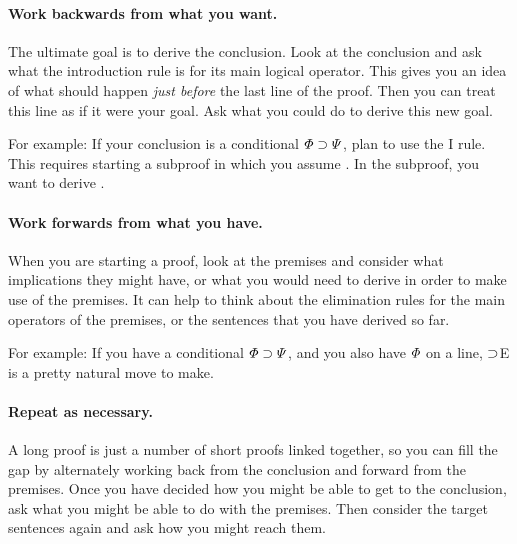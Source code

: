 \paragraph{Work backwards from what you want.}
The ultimate goal is to derive the conclusion. Look at the conclusion and ask what the introduction rule is for its main logical operator. This gives you an idea of what should happen \emph{just before} the last line of the proof. Then you can treat this line as if it were your goal. Ask what you could do to derive this new goal.

For example: If your conclusion is a conditional $\varPhi{}\supset\varPsi{}$, plan to use the {\eif}I rule. This requires starting a subproof in which you assume \metaA{}. In the subproof, you want to derive \metaB{}.

\paragraph{Work forwards from what you have.}
When you are starting a proof, look at the premises and consider what implications they might have, or what you would need to derive in order to make use of the premises.
It can help to think about the elimination rules for the main operators of the premises, or the sentences that you have derived so far.

For example: If you have a conditional $\varPhi\supset\varPsi$, and you also have $\varPhi$ on a line, $\supset$E is a pretty natural move to make.

%
%

\paragraph{Repeat as necessary.}
A long proof is just a number of short proofs linked together, so you can fill the gap by alternately working back from the conclusion and forward from the premises.
Once you have decided how you might be able to get to the conclusion, ask what you might be able to do with the premises.
Then consider the target sentences again and ask how you might reach them.


